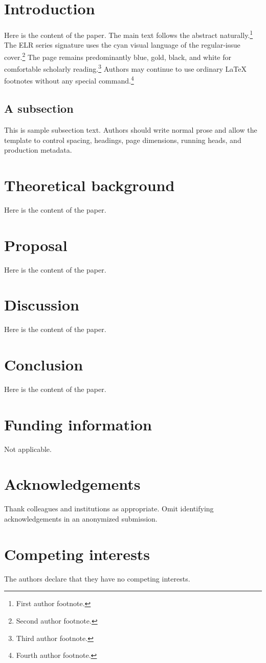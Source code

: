 \documentclass[11pt,a4paper]{article}
\begin{document}
\ELRMakeTitle

\section{Introduction}
Here is the content of the paper. The main text follows the abstract naturally.\footnote{First author footnote.} The ELR series signature uses the cyan visual language of the regular-issue cover.\footnote{Second author footnote.} The page remains predominantly blue, gold, black, and white for comfortable scholarly reading.\footnote{Third author footnote.} Authors may continue to use ordinary LaTeX footnotes without any special command.\footnote{Fourth author footnote.}

\subsection{A subsection}
This is sample subsection text. Authors should write normal prose and allow the template to control spacing, headings, page dimensions, running heads, and production metadata.

\section{Theoretical background}
Here is the content of the paper.

\section{Proposal}
Here is the content of the paper.

\section{Discussion}
Here is the content of the paper.

\section{Conclusion}
Here is the content of the paper.

\section*{Funding information}
Not applicable.

\section*{Acknowledgements}
Thank colleagues and institutions as appropriate. Omit identifying acknowledgements in an anonymized submission.

\section*{Competing interests}
The authors declare that they have no competing interests.

\nocite{*}


\ELREndMatter
\end{document}
